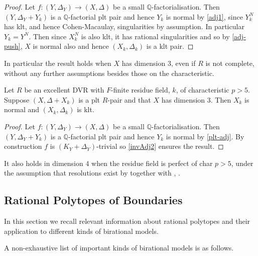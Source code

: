 \begin{proof}
	
	Let $f\colon (Y,\Delta_{Y})\to (X,\Delta)$ be a small $\mathbb{Q}$-factorialisation. Then $(Y,\Delta_{Y}+Y_{k})$ is a $\mathbb{Q}$-factorial plt pair and hence $Y_{k}$ is normal by \autoref{adj1}, since $Y_{k}^{N}$ has klt, and hence Cohen-Macaulay, singularities by assumption. In particular $Y_{k}=Y^{N}$. Then since $X_{k}^{N}$ is also klt, it has rational singularities and so by \autoref{adj-push}, $X$ is normal also and hence $(X_{k},\Delta_{k})$ is a klt pair.
	
\end{proof}

In particular the result holds when $X$ has dimension $3$, even if $R$ is not complete, without any further assumptions besides those on the characteristic.
 

\begin{corollary}\label{invAdj3}
	Let $R$ be an excellent DVR with $F$-finite residue field, $k$, of characteristic $p> 5$. Suppose $(X,\Delta+X_{k})$ is a plt $R$-pair and that $X$ has dimension $3$. Then $X_{k}$ is normal and $(X_{k}, \Delta_{k})$ is klt.
\end{corollary}

\begin{proof}
	Let $f\colon (Y,\Delta_{Y})\to (X,\Delta)$ be a small $\mathbb{Q}$-factorialisation. Then $(Y,\Delta_{Y}+Y_{k})$ is a $\mathbb{Q}$-factorial plt pair and hence $Y_{k}$ is normal by \autoref{plt-adj}. By construction $f$ is $(K_{Y}+\Delta_{Y})$-trivial so \autoref{invAdj2} ensures the result.
\end{proof}

It also holds in dimension $4$ when the residue field is perfect of char $p>5$, under the assumption that resolutions exist by \cite{hacon2020relative} together with \cite[Theorem 1.1]{hacon2017rationality}, \cite[Corollary 1.3]{arvidsson2020kawamata}.


\subsection{Rational Polytopes of Boundaries}

In this section we recall relevant information about rational polytopes and their application to different kinds of birational models.

A non-exhaustive list of important kinds of birational models is as follows.

